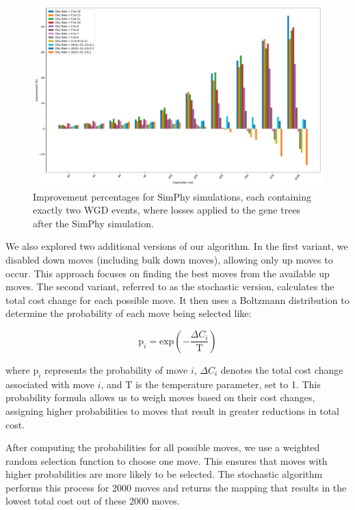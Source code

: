 \documentclass[10pt]{article}
\begin{document}
\begin{figure}[hbt!]
    \centering
    \includegraphics[width=1\textwidth]{figs/imp_2WGD.pdf}
    \caption{Improvement percentages for SimPhy simulations, each containing exactly two WGD events, where losses applied to the gene trees after the SimPhy simulation.}
    \label{fig:imp_2wgd}
\end{figure}

We also explored two additional versions of our algorithm. In the first variant, we disabled down moves (including bulk down moves), allowing only up moves to occur. This approach focuses on finding the best moves from the available up moves. The second variant, referred to as the stochastic version, calculates the total cost change for each possible move. It then uses a Boltzmann distribution to determine the probability of each move being selected like:

$$
\text{p}_i = \text{exp} \left(- \frac{\Delta C_i}{\text{T}}\right)
$$

where $\text{p}_i$ represents the probability of move $i$, $\Delta C_i$ denotes the total cost change associated with move $i$, and $\text{T}$ is the temperature parameter, set to 1. This probability formula allows us to weigh moves based on their cost changes, assigning higher probabilities to moves that result in greater reductions in total cost.

After computing the probabilities for all possible moves, we use a weighted random selection function to choose one move. This ensures that moves with higher probabilities are more likely to be selected. The stochastic algorithm performs this process for 2000 moves and returns the mapping that results in the lowest total cost out of these 2000 moves.
\end{document}
